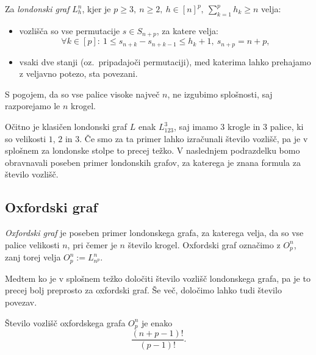 \documentclass[twoside,11pt]{article}
\begin{document}
\begin{definicija}
    Za \emph{londonski graf} $L_h^n$, kjer je $p \geq 3,\ n \geq 2,\ h \in [n]^p,\  \sum_{k=1}^p h_k \geq n$ velja:
    \begin{itemize}
        \item vozlišča so vse permutacije $s \in S_{n+p}$, za katere velja:
        \[\forall k \in [p]:\ 1 \leq s_{n+k} - s_{n+k-1} \leq h_k + 1,\ s_{n+p} = n + p ,\]
        \item vsaki dve stanji (oz.\ pripadajoči permutaciji), med katerima lahko prehajamo z veljavno potezo, sta povezani.
    \end{itemize}
\end{definicija}

S pogojem, da so vse palice visoke največ $n$, ne izgubimo splošnosti, saj razporejamo le $n$ krogel.

Očitno je klasičen londonski graf $L$ enak $L_{123}^3$, saj imamo $3$ krogle in $3$ palice, ki so velikosti $1$, $2$ in $3$.
Če smo za ta primer lahko izračunali število vozlišč, pa je v splošnem za londonske stolpe to precej težko. V naslednjem podrazdelku bomo obravnavali poseben primer londonskih grafov, za katerega je znana formula za število vozlišč. 

\subsection{Oxfordski graf}

\emph{Oxfordski graf} je poseben primer londonskega grafa, za katerega velja, da so vse palice velikosti $n$, pri čemer je $n$ število krogel. Oxfordski graf označimo z $O^n_p$, zanj torej velja $O^n_p := L^n_{n^p}$.

Medtem ko je v splošnem težko določiti število vozlišč londonskega grafa, pa je to precej bolj preprosto za oxfordski graf. Še več, določimo lahko tudi število povezav.

\begin{trditev}
    Število vozlišč oxfordskega grafa $O^n_p$ je enako 
    \begin{equation}
    \label{eq:oxford-vozl}
    \frac{(n+p-1)!}{(p-1)!}.
    \end{equation}
    
\end{trditev}
\end{document}
